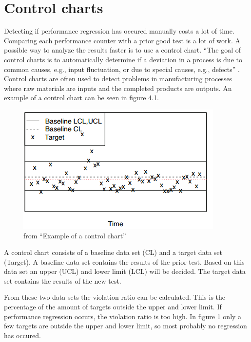 \section{Control charts}
Detecting if performance regression has occured manually costs a lot of time. Comparing each performance counter with a prior good test is a lot of work. A possible way to analyze the results faster is to use a control chart.
``The goal of control charts is to automatically determine if a deviation in a process is due to common causes, e.g., input fluctuation, or due to special causes, e.g., defects'' \cite{nguyen2012using}. Control charts are often used to detect problems in manufacturing processes where raw materials are inputs and the completed products are outputs. An example of a control chart can be seen in figure 4.1. \

\begin{figure}[h]
\begin{center}
  \includegraphics[scale=0.7]{Figures/controlchart.png}
\end{center}
  \caption{from ``Example of a control chart''\cite{nguyen2012using}}

\end{figure}


A control chart consists of a baseline data set (CL) and a target data set (Target). A baseline data set contains the results of the prior test. Based on this data set an upper (UCL) and lower limit (LCL) will be decided. The target data set contains the results of the new test.

From these two data sets the violation ratio can be calculated. This is the percentage of the amount of targets outside the upper and lower limit. If performance regression occurs, the violation ratio is too high. In figure 1 only a few targets are outside the upper and lower limit, so most probably no regression has occured.

